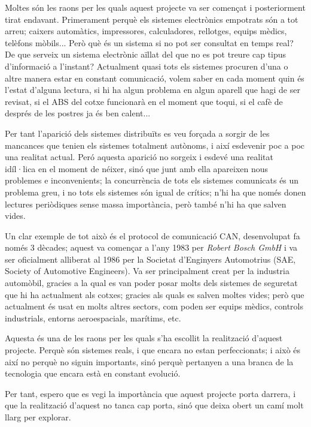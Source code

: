 Moltes són les raons per les quals aquest projecte va ser començat i posteriorment tirat endavant. Primerament perquè els sistemes electrònics empotrats són a tot arreu; caixers automàtics, impressores, calculadores, rellotges, equips mèdics, telèfons mòbils... Però què és un sistema si no pot ser consultat en temps real? De que serveix un sistema electrònic aïllat del que no es pot treure cap tipus d'informació a l'instant? Actualment quasi tots els sistemes procuren d'una o altre manera estar en constant comunicació, volem saber en cada moment quin és l'estat d'alguna lectura, si hi ha algun problema en algun aparell que hagi de ser revisat, si el ABS del cotxe funcionarà en el moment que toqui, si el cafè de després de les postres ja és ben calent... 
 
Per tant l'aparició dels sistemes distribuïts es veu forçada a sorgir de les mancances que tenien els sistemes totalment autònoms, i així esdevenir poc a poc una realitat actual. Peró aquesta aparició no sorgeix i esdevé una realitat idíl·lica en el moment de néixer, sinó que junt amb ella apareixen nous problemes e inconvenients; la concurrència de tots els sistemes comunicats és un problema greu, i no tots els sistemes són igual de crítics; n'hi ha que només donen lectures periòdiques sense massa importància, però també n'hi ha que salven vides.

Un clar exemple de tot això és el protocol de comunicació CAN, desenvolupat fa només 3 dècades; aquest va començar a l'any 1983 per \emph{Robert Bosch GmbH} i va ser oficialment alliberat al 1986 per la Societat d'Enginyers Automotrius (SAE, Society of Automotive Engineers). Va ser principalment creat per la industria automòbil, gracies a la qual es van poder posar molts dels sistemes de seguretat que hi ha actualment als cotxes; gracies als quals es salven moltes vides; però que actualment és usat en molts altres sectors, com poden ser equips mèdics, controls industrials, entorns aeroespacials, marítims, etc.

Aquesta és una de les raons per les quals s'ha escollit la realització d'aquest projecte. Perquè són sistemes reals, i que encara no estan perfeccionats; i això és així no perquè no siguin importants, sinó perquè pertanyen a una branca de la tecnologia que encara està en constant evolució.

Per tant, espero que es vegi la importància que aquest projecte porta darrera, i que la realització d'aquest no tanca cap porta, sinó que deixa obert un camí molt llarg per explorar.


